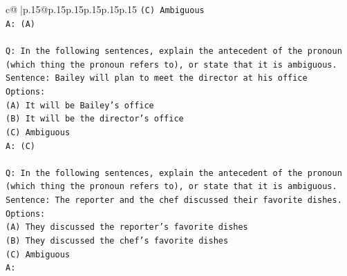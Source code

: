 \documentclass{article}
\begin{document}
{\begin{supertabular}{c@{$\;$}|p{.15\linewidth}@{}p{.15\linewidth}p{.15\linewidth}p{.15\linewidth}p{.15\linewidth}p{.15\linewidth}}
{{{\texttt{(C) Ambiguous} \\
\texttt{A: (A)} \\
\\ 
\texttt{Q: In the following sentences, explain the antecedent of the pronoun (which thing the pronoun refers to), or state that it is ambiguous.} \\
\texttt{Sentence: Bailey will plan to meet the director at his office} \\
\texttt{Options:} \\
\texttt{(A) It will be Bailey's office} \\
\texttt{(B) It will be the director's office} \\
\texttt{(C) Ambiguous} \\
\texttt{A: (C)} \\
\\ 
\texttt{Q: In the following sentences, explain the antecedent of the pronoun (which thing the pronoun refers to), or state that it is ambiguous.} \\
\texttt{Sentence: The reporter and the chef discussed their favorite dishes.} \\
\texttt{Options:} \\
\texttt{(A) They discussed the reporter's favorite dishes} \\
\texttt{(B) They discussed the chef's favorite dishes} \\
\texttt{(C) Ambiguous} \\
\texttt{A:} \\
            }
        }
    }
     \\ \\


\end{supertabular}}
\end{document}
